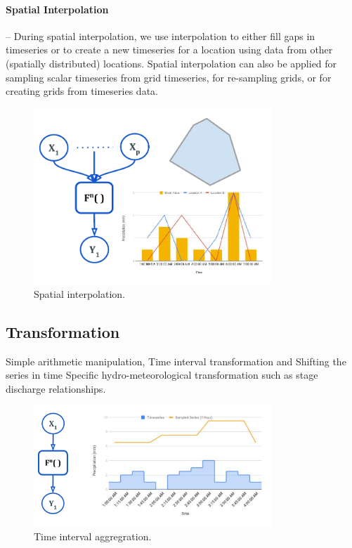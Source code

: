 \paragraph{Spatial Interpolation}-- During spatial interpolation, we use interpolation to either fill gaps in timeseries or to create a new timeseries for a location using data from other (spatially distributed) locations. Spatial interpolation can also be applied for sampling scalar timeseries from grid timeseries, for re-sampling grids, or for creating grids from timeseries data.
\begin{figure}[htp]
    \centering
    \includegraphics[width=0.8\textwidth]{method/data_preprocess/spatial_interpolation.pdf}
    \caption{Spatial interpolation.}
    \label{fi:spatial_interpolation}
\end{figure}

\subsection{Transformation}
Simple arithmetic manipulation, Time interval transformation and Shifting the series in time Specific hydro-meteorological transformation such as stage discharge relationships.
\begin{figure}[htp]
    \centering
    \includegraphics[width=0.8\textwidth]{method/data_preprocess/transformation.pdf}
    \caption{Time interval aggregration.}
    \label{fi:transformation}
\end{figure}

